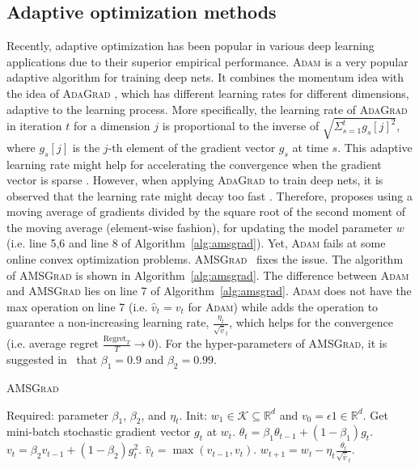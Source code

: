 \documentclass[11pt]{article}
\def\K{\mathcal{K}}
\theoremstyle{k}
\begin{document}
\subsection{Adaptive optimization methods}



Recently, adaptive optimization has been popular in various deep learning applications due to their superior empirical performance. \textsc{Adam} \cite{KB15} is a very popular adaptive algorithm for training deep nets.
It combines the momentum idea \cite{P64} with the idea of \textsc{AdaGrad} \cite{DHS11},
which has different learning rates for different dimensions, adaptive to the learning process. More specifically, the learning rate of \textsc{AdaGrad} in iteration $t$ for a dimension $j$ is proportional to the inverse of $\sqrt{ \Sigma_{s=1}^t g_s[j]^2 }$,
where $g_s[j]$ is the $j$-th element of the gradient vector $g_s$ 
at time $s$.
This adaptive learning rate might help for accelerating the convergence when the gradient vector is sparse \cite{DHS11}. However,
when applying \textsc{AdaGrad} to train deep nets,
it is observed that the learning rate might decay too fast \cite{KB15}.
Therefore, \cite{KB15} proposes using a moving average of gradients 
divided by the square root of the second moment of the moving average (element-wise fashion), for updating the model parameter $w$ (i.e. line 5,6 and line 8 of Algorithm~\ref{alg:amsgrad}).
Yet, \textsc{Adam} \cite{KB15} fails at some online convex optimization problems. \textsc{AMSGrad}~\cite{RKK18} fixes the issue. 
The algorithm of \textsc{AMSGrad} is shown in Algorithm~\ref{alg:amsgrad}.
The difference between \textsc{Adam} and 
\textsc{AMSGrad} lies on line 7 of Algorithm~\ref{alg:amsgrad}.
\textsc{Adam} does not have the max operation on line 7 (i.e. $\hat{v}_t = v_t$ for \textsc{Adam}) while
\cite{RKK18} adds the operation to guarantee a non-increasing learning rate,
$\frac{\eta_t }{ \sqrt{\hat{v}}_t }$,
which helps for the convergence (i.e. average regret $\frac{\text{Regret}_T}{T} \rightarrow 0$).
For the hyper-parameters of \textsc{AMSGrad}, it is suggested in~\cite{RKK18} that $\beta_1=0.9$ and $\beta_2=0.99$.


\begin{algorithm}[H]
\begin{algorithmic}[1]
\small
\caption{\textsc{AMSGrad} \cite{RKK18}} \label{alg:amsgrad}
\STATE Required: parameter $\beta_1$, $\beta_2$, and $\eta_t$. 
\STATE Init: $w_{1} \in \K \subseteq \mathbb R^d $ and $v_{0} = \epsilon 1 \in \mathbb R^{d}$.
\STATE Get mini-batch stochastic gradient vector $g_t$ at $w_t$.
\STATE $\theta_t = \beta_1 \theta_{t-1} + (1 - \beta_1) g_t$.
\STATE $v_t = \beta_2 v_{t-1} + (1 - \beta_2) g_t^2$. 
\STATE $\hat{v}_t = \max( \hat{v}_{t-1} , v_t )$. 
\STATE $w_{t+1} = w_t - \eta_t \frac{\theta_t}{ \sqrt{\hat{v}}_t }$.
\ENDFOR
\end{algorithmic}
\end{algorithm}
\end{document}
